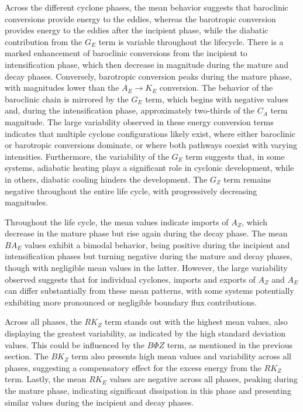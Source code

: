 \documentclass[pdflatex,sn-chicago]{sn-jnl}%
\theoremstyle{plain}
\theoremstyle{definition}
\theoremstyle{remark}
\theoremstyle{definition}
\begin{document}
Across the different cyclone phases, the mean behavior suggests that baroclinic conversions provide energy to the eddies, whereas the barotropic conversion provides energy to the eddies after the incipient phase, while the diabatic contribution from the $G_E$ term is variable throughout the lifecycle. There is a marked enhancement of baroclinic conversions from the incipient to intensification phase, which then decrease in magnitude during the mature and decay phases. Conversely, barotropic conversion peaks during the mature phase, with magnitudes lower than the $A_E \rightarrow K_E$ conversion. The behavior of the baroclinic chain is mirrored by the $G_E$ term, which begins with negative values and, during the intensification phase, approximately two-thirds of the $C_A$ term magnitude. The large variability observed in these energy conversion terms indicates that multiple cyclone configurations likely exist, where either baroclinic or barotropic conversions dominate, or where both pathways coexist with varying intensities. Furthermore, the variability of the $G_E$ term suggests that, in some systems, adiabatic heating plays a significant role in cyclonic development, while in others, diabatic cooling hinders the development. The $G_Z$ term remains negative throughout the entire life cycle, with progressively decreasing magnitudes.

Throughout the life cycle, the mean values indicate imports of $A_Z$, which decrease in the mature phase but rise again during the decay phase. The mean $BA_E$ values exhibit a bimodal behavior, being positive during the incipient and intensification phases but turning negative during the mature and decay phases, though with negligible mean values in the latter. However, the large variability observed suggests that for individual cyclones, imports and exports of $A_Z$ and $A_E$ can differ substantially from these mean patterns, with some systems potentially exhibiting more pronounced or negligible boundary flux contributions.

Across all phases, the $RK_Z$ term stands out with the highest mean values, also displaying the greatest variability, as indicated by the high standard deviation values. This could be influenced by the $B\Phi Z$ term, as mentioned in the previous section. The $BK_Z$ term also presents high mean values and variability across all phases, suggesting a compensatory effect for the excess energy from the $RK_Z$ term. Lastly, the mean $RK_E$ values are negative across all phases, peaking during the mature phase, indicating significant dissipation in this phase and presenting similar values during the incipient and decay phases.
\end{document}
